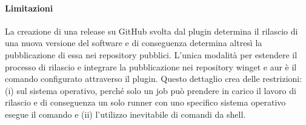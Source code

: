 \paragraph{Limitazioni}\label{sec:release-limitation} La creazione di una release su GitHub svolta dal plugin determina il rilascio di una nuova versione del software e di conseguenza determina altresì la pubblicazione di essa nei repository pubblici. L'unica modalità per estendere il processo di rilascio e integrare la pubblicazione nei repository winget e \ac{aur} è il comando configurato attraverso il plugin. Questo dettaglio crea delle restrizioni: (i) sul sistema operativo, perché solo un job può prendere in carico il lavoro di rilascio e di conseguenza un solo runner con uno specifico sistema operativo esegue il comando e (ii) l'utilizzo inevitabile di comandi da shell. 